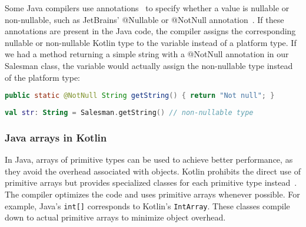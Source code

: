 \documentclass[a4paper,11pt]{article}
\begin{document}
Some Java compilers use annotations~\cite{interop-nullability-annotations} to specify whether a value is nullable or non-nullable, such as JetBrains' @Nullable or @NotNull annotation~\cite{JetBrains-annotations}. If these annotations are present in the Java code, the compiler assigns the corresponding nullable or non-nullable Kotlin type to the variable instead of a platform type. If we had a method returning a simple string with a @NotNull annotation in our Salesman class, the variable would actually assign the non-nullable type instead of the platform type:
\begin{lstlisting}[language=Java]
public static @NotNull String getString() { return "Not null"; }
\end{lstlisting}
\begin{lstlisting}[language=Kotlin]
val str: String = Salesman.getString() // non-nullable type
\end{lstlisting}

\subsubsection{Java arrays in Kotlin}
In Java, arrays of primitive types can be used to achieve better performance, as they avoid the overhead associated with objects. Kotlin prohibits the direct use of primitive arrays but provides specialized classes for each primitive type instead~\cite{interop-arrays}. The compiler optimizes the code and uses primitive arrays whenever possible. For example, Java's \texttt{int[]} corresponds to Kotlin's \texttt{IntArray}. These classes compile down to actual primitive arrays to minimize object overhead.
\end{document}
